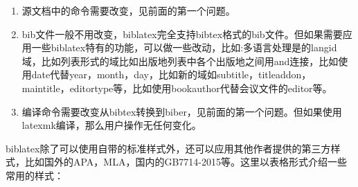 
\begin{enumerate}

  \item 源文档中的命令需要改变，见前面的第一个问题。

  \item bib文件一般不用改变，biblatex完全支持bibtex格式的bib文件。但如果需要应用一些biblatex特有的功能，可以做一些改动，比如:多语言处理是的langid域，比如列表形式的域比如出版地列表中各个出版地之间用and连接，比如使用date代替year，month，day，比如新的域如subtitle，titleaddon，maintitle，editortype等，比如使用bookauthor代替会议文件的editor等。

  \item 编译命令需要改变从bibtex转换到biber，见前面的第一个问题。但如果使用latexmk编译，那么用户操作无任何变化。
\end{enumerate}





biblatex除了可以使用自带的标准样式外，还可以应用其他作者提供的第三方样式，比如国外的APA，MLA，国内的GB7714-2015等。这里以表格形式介绍一些常用的样式：

